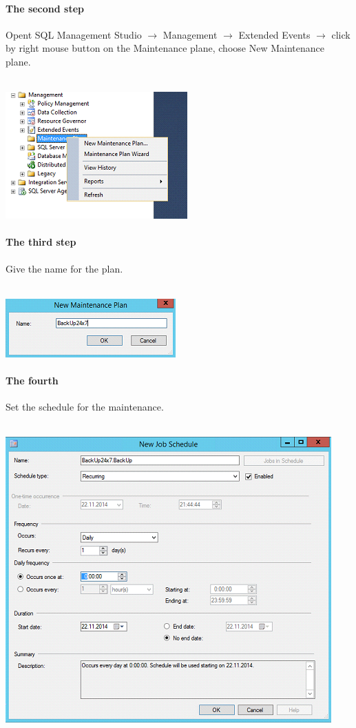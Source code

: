 \documentclass[english]{article}
\begin{document}
\paragraph{The second step} Opent SQL Management Studio $\rightarrow $ Management $\rightarrow $ Extended Events $\rightarrow $ click by right mouse button on the Maintenance plane, choose New Maintenance plane.\\\\
\centerline{\includegraphics[scale=0.8]{administration/13}}
\paragraph{The third step} Give the name for the plan.\\\\
\centerline{\includegraphics[scale=0.8]{administration/14}}
\paragraph{The fourth} Set the schedule for the maintenance.\\\\
\centerline{\includegraphics[scale=0.8]{administration/15}}
\end{document}
